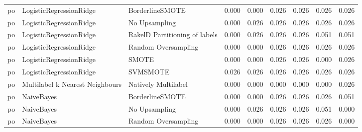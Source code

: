 \begin{tabular}{lllllllll}
      po &         LogisticRegressionRidge &               BorderlineSMOTE &     0.000 &                     0.000 &                 0.026 &                  0.026 &                                   0.026 &     0.026 \\
      po &         LogisticRegressionRidge &                 No Upsampling &     0.000 &                     0.026 &                 0.026 &                  0.026 &                                   0.026 &     0.026 \\
      po &         LogisticRegressionRidge & RakelD Partitioning of labels &     0.000 &                     0.026 &                 0.026 &                  0.026 &                                   0.051 &     0.051 \\
      po &         LogisticRegressionRidge &           Random Oversampling &     0.000 &                     0.000 &                 0.026 &                  0.026 &                                   0.026 &     0.026 \\
      po &         LogisticRegressionRidge &                         SMOTE &     0.000 &                     0.000 &                 0.026 &                  0.026 &                                   0.000 &     0.026 \\
      po &         LogisticRegressionRidge &                      SVMSMOTE &     0.026 &                     0.026 &                 0.026 &                  0.026 &                                   0.026 &     0.026 \\
      po & Multilabel k Nearest Neighbours &           Natively Multilabel &     0.000 &                     0.000 &                 0.000 &                  0.000 &                                   0.000 &     0.026 \\
      po &                      NaiveBayes &               BorderlineSMOTE &     0.000 &                     0.000 &                 0.026 &                  0.026 &                                   0.026 &     0.051 \\
      po &                      NaiveBayes &                 No Upsampling &     0.000 &                     0.026 &                 0.026 &                  0.026 &                                   0.051 &     0.000 \\
      po &                      NaiveBayes &           Random Oversampling &     0.000 &                     0.000 &                 0.026 &                  0.026 &                                   0.026 &     0.000 \\

\end{tabular}
